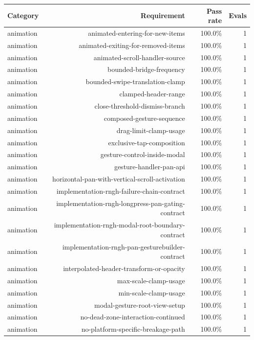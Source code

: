\begin{table}[htbp]
\centering
\begin{tabular}{lrrr}
\toprule
Category & Requirement & Pass rate & Evals \\
\midrule
animation & animated-entering-for-new-items & 100.0\% & 1 \\
animation & animated-exiting-for-removed-items & 100.0\% & 1 \\
animation & animated-scroll-handler-source & 100.0\% & 1 \\
animation & bounded-bridge-frequency & 100.0\% & 1 \\
animation & bounded-swipe-translation-clamp & 100.0\% & 1 \\
animation & clamped-header-range & 100.0\% & 1 \\
animation & close-threshold-dismiss-branch & 100.0\% & 1 \\
animation & composed-gesture-sequence & 100.0\% & 1 \\
animation & drag-limit-clamp-usage & 100.0\% & 1 \\
animation & exclusive-tap-composition & 100.0\% & 1 \\
animation & gesture-control-inside-modal & 100.0\% & 1 \\
animation & gesture-handler-pan-api & 100.0\% & 1 \\
animation & horizontal-pan-with-vertical-scroll-activation & 100.0\% & 1 \\
animation & implementation-rngh-failure-chain-contract & 100.0\% & 1 \\
animation & implementation-rngh-longpress-pan-gating-contract & 100.0\% & 1 \\
animation & implementation-rngh-modal-root-boundary-contract & 100.0\% & 1 \\
animation & implementation-rngh-pan-gesturebuilder-contract & 100.0\% & 1 \\
animation & interpolated-header-transform-or-opacity & 100.0\% & 1 \\
animation & max-scale-clamp-usage & 100.0\% & 1 \\
animation & min-scale-clamp-usage & 100.0\% & 1 \\
animation & modal-gesture-root-view-setup & 100.0\% & 1 \\
animation & no-dead-zone-interaction-continued & 100.0\% & 1 \\
animation & no-platform-specific-breakage-path & 100.0\% & 1 \\

\end{tabular}
\end{table}
